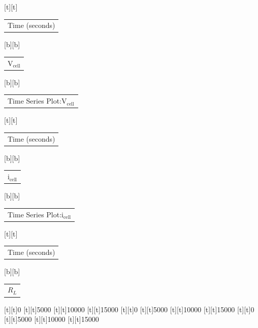 %    
%
%
\begin{psfrags}%
\psfragscanon%
%
[t][t]{\color[rgb]{0,0,0}\setlength{\tabcolsep}{0pt}\begin{tabular}{c}Time (seconds)\end{tabular}}%
[b][b]{\color[rgb]{0,0,0}\setlength{\tabcolsep}{0pt}\begin{tabular}{c}$\mathrm{V_{cell}}$\end{tabular}}%
[b][b]{\color[rgb]{0,0,0}\setlength{\tabcolsep}{0pt}\begin{tabular}{c}Time Series Plot:$\mathrm{V_{cell}}$\end{tabular}}%
[t][t]{\color[rgb]{0,0,0}\setlength{\tabcolsep}{0pt}\begin{tabular}{c}Time (seconds)\end{tabular}}%
[b][b]{\color[rgb]{0,0,0}\setlength{\tabcolsep}{0pt}\begin{tabular}{c}$\mathrm{i_{cell}}$\end{tabular}}%
[b][b]{\color[rgb]{0,0,0}\setlength{\tabcolsep}{0pt}\begin{tabular}{c}Time Series Plot:$\mathrm{i_{cell}}$\end{tabular}}%
[t][t]{\color[rgb]{0,0,0}\setlength{\tabcolsep}{0pt}\begin{tabular}{c}Time (seconds)\end{tabular}}%
[b][b]{\color[rgb]{0,0,0}\setlength{\tabcolsep}{0pt}\begin{tabular}{c}$R_L$\end{tabular}}%
%
[t][t]{0}%
[t][t]{5000}%
[t][t]{10000}%
[t][t]{15000}%
[t][t]{0}%
[t][t]{5000}%
[t][t]{10000}%
[t][t]{15000}%
[t][t]{0}%
[t][t]{5000}%
[t][t]{10000}%
[t][t]{15000}%
%

\end{psfrags}
